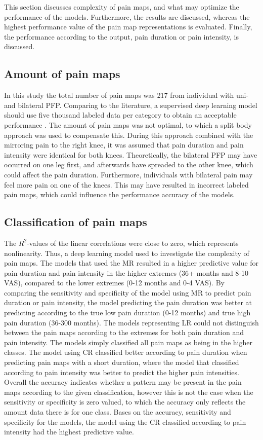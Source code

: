 This section discusses complexity of pain maps, and what may optimize the performance of the models. Furthermore, the results are discussed, whereas the highest performance value of the pain map representations is evaluated. Finally, the performance according to the output, pain duration or pain intensity, is discussed.

\subsection{Amount of pain maps}
In this study the total number of pain maps was 217 from individual with uni- and bilateral PFP. Comparing to the literature, a supervised deep learning model should use five thousand labeled data per category to obtain an acceptable performance \citep{Goodfellow2016}.
The amount of pain maps was not optimal, to which a split body approach was used to compensate this. During this approach combined with the mirroring pain to the right knee, it was assumed that pain duration and pain intensity were identical for both knees. Theoretically, the bilateral PFP may have occurred on one leg first, and afterwards have spreaded to the other knee, which could affect the pain duration. Furthermore, individuals with bilateral pain may feel more pain on one of the knees. This may have resulted in incorrect labeled pain maps, which could influence the performance accuracy of the models.

\subsection{Classification of pain maps}
The $R^2$-values of the linear correlations were close to zero, which represents nonlinearity. Thus, a deep learning model used to investigate the complexity of pain maps.
The models that used the MR resulted in a higher predictive value for pain duration and pain intensity in the higher extremes (36+ months and 8-10 VAS), compared to the lower extremes (0-12 months and 0-4 VAS). By comparing the sensitivity and specificity of the model using MR to predict pain duration or pain intensity, the model predicting the pain duration was better at predicting according to the true low pain duration (0-12 months) and true high pain duration (36-300 months). The models representing LR could not distinguish between the pain maps according to the extremes for both pain duration and pain intensity. The models simply classified all pain maps as being in the higher classes. 
The model using CR classified better according to pain duration when predicting pain maps with a short duration, where the model that classified according to pain intensity was better to predict the higher pain intensities. 
Overall the accuracy indicates whether a pattern may be present in the pain maps according to the given classification, however this is not the case when the sensitivity or specificity is zero valued, to which the accuracy only reflects the amount data there is for one class. Bases on the accuracy, sensitivity and specificity for the models, the model using the CR classified according to pain intensity had the highest predictive value.

